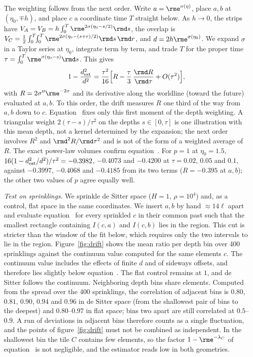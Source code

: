 \documentclass[12pt]{iopart}
\begin{document}
The weighting follows from the next order. Write $a=\rme^{\sigma(\eta)}$, place $a,b$ at $(\eta_0,\mp h)$, and place $c$ a coordinate time $T$ straight below. As $h\to0$, the strips have $V_A=V_B=h\int_0^T\rme^{2\sigma(\eta_0-s/2)}\rmd s$, the overlap is $V_C=\tfrac12\int_0^T\!\!\int_0^T\rme^{2\sigma(\eta_0-(s+r)/2)}\rmd s\,\rmd r$, and $d=2h\rme^{\sigma(\eta_0)}$. We expand $\sigma$ in a Taylor series at $\eta_0$, integrate term by term, and trade $T$ for the proper time $\tau=\int_0^T\rme^{\sigma(\eta_0-s)}\rmd s$. This gives
\begin{equation}
1-\frac{d^2_{\rm est}}{d^2}=\frac{\tau^2}{16}\Big[R-\frac{\tau}{3}\,\frac{\rmd R}{\rmd\tau}+O(\tau^2)\Big],
\label{eq:kernel}
\end{equation}
with $R=2\sigma''\rme^{-2\sigma}$ and its derivative along the worldline (toward the future) evaluated at $a,b$. To this order, the drift measures $R$ one third of the way from $a,b$ down to $c$. Equation~ fixes only this first moment of the depth weighting. A triangular weight $2(\tau-s)/\tau^2$ on the depths $s\in[0,\tau]$ is one illustration with this mean depth, not a kernel determined by the expansion; the next order involves $R^2$ and $\rmd^2R/\rmd\tau^2$ and is not of the form of a weighted average of $R$. The exact power-law volumes confirm equation~. For $p=1$ at $\eta_0=1.5$, $16(1-d^2_{\rm est}/d^2)/\tau^2=-0.3982$, $-0.4073$ and $-0.4200$ at $\tau=0.02$, $0.05$ and $0.1$, against $-0.3997$, $-0.4068$ and $-0.4185$ from its two terms ($R=-0.395$ at $a,b$); the other two values of $p$ agree equally well.

\emph{Test on sprinklings.} We sprinkle de Sitter space ($H=1$, $\rho=10^4$) and, as a control, flat space in the same coordinates. We insert $a,b$ by hand $\approx14\ell$ apart and evaluate equation~ for every sprinkled $c$ in their common past such that the smallest rectangle containing $I(c,a)$ and $I(c,b)$ lies in the region. This cut is stricter than the window of the fit below, which requires only the two intervals to lie in the region. Figure~\ref{fig:drift} shows the mean ratio per depth bin over 400 sprinklings against the continuum value computed for the same elements $c$. The continuum value includes the effects of finite $d$ and of sideways offsets, and therefore lies slightly below equation~. The flat control remains at $1$, and de Sitter follows the continuum. Neighboring depth bins share elements. Computed from the spread over the 400 sprinklings, the correlation of adjacent bins is $0.80$, $0.81$, $0.90$, $0.94$ and $0.96$ in de Sitter space (from the shallowest pair of bins to the deepest) and $0.80$--$0.97$ in flat space; bins two apart are still correlated at $0.5$--$0.9$. A run of deviations in adjacent bins therefore counts as a single fluctuation, and the points of figure~\ref{fig:drift} must not be combined as independent. In the shallowest bin the tile $C$ contains few elements, so the factor $1-\rme^{-\lambda_C}$ of equation~ is not negligible, and the estimator reads low in both geometries.
\end{document}
